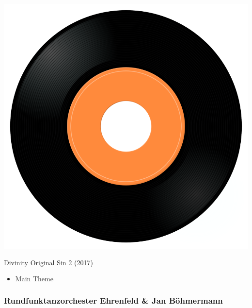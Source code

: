 \begin{minipage}[t]{0.25\textwidth}\vspace{0pt}
\captionsetup{type=figure}
\includegraphics[width=\textwidth]{Images/cover.png}
\caption*{Divinity Original Sin 2 (2017)}
\end{minipage}
\begin{minipage}[t]{0.25\textwidth}\vspace{0pt}
\begin{itemize}[nosep,leftmargin=1em,labelwidth=*,align=left]
	\setlength{\itemsep}{0pt}
	\item Main Theme
\end{itemize}
\end{minipage}


\subsubsection{Rundfunktanzorchester Ehrenfeld \& Jan Böhmermann}

